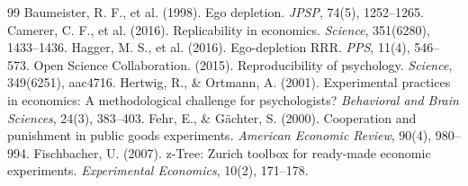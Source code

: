 \documentclass[11pt,a4paper]{article}
\theoremstyle{remark}
\begin{document}
\newpage

\begin{thebibliography}{99}
 Baumeister, R. F., et al. (1998). Ego depletion. \textit{JPSP}, 74(5), 1252--1265.
 Camerer, C. F., et al. (2016). Replicability in economics. \textit{Science}, 351(6280), 1433--1436.
 Hagger, M. S., et al. (2016). Ego-depletion RRR. \textit{PPS}, 11(4), 546--573.
 Open Science Collaboration. (2015). Reproducibility of psychology. \textit{Science}, 349(6251), aac4716.
 Hertwig, R., \& Ortmann, A. (2001). Experimental practices in economics: A methodological challenge for psychologists? \textit{Behavioral and Brain Sciences}, 24(3), 383--403.
 Fehr, E., \& Gächter, S. (2000). Cooperation and punishment in public goods experiments. \textit{American Economic Review}, 90(4), 980--994.
 Fischbacher, U. (2007). z-Tree: Zurich toolbox for ready-made economic experiments. \textit{Experimental Economics}, 10(2), 171--178.
\end{thebibliography}
\end{document}
